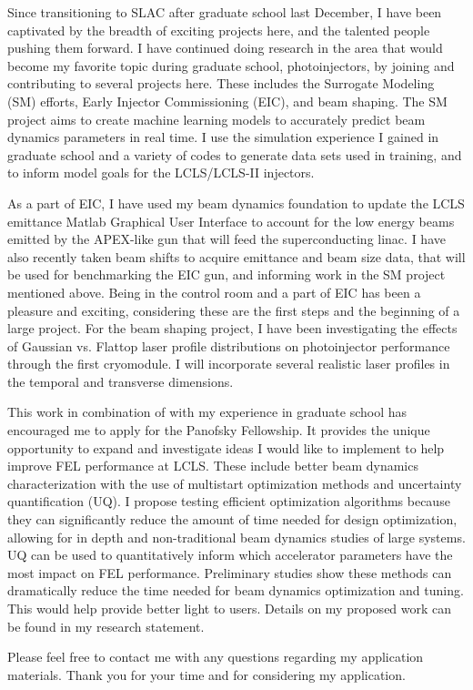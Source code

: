 Since transitioning to SLAC after graduate school last December, 
I have been captivated by the breadth of exciting projects here, 
and the talented people pushing them forward.
I have continued doing research in the area that
 would become my favorite topic during graduate school, photoinjectors, 
 by joining and contributing to several projects here. 
 These includes the Surrogate Modeling (SM) efforts, Early Injector Commissioning (EIC), and beam shaping. 
 The SM project aims to create machine learning models to accurately predict 
 beam dynamics parameters in real time. 
 I use the simulation experience I gained in graduate school and a variety of codes to generate data sets used in training, 
 and to inform model goals for the LCLS/LCLS-II injectors.
 
 As a part of EIC, I have used my beam dynamics foundation to update the 
 LCLS emittance Matlab Graphical User Interface to account for the low energy beams emitted by the 
 APEX-like gun that will feed the superconducting linac. I have also recently 
 taken beam shifts to acquire emittance and beam size data, that will be used 
 for benchmarking the EIC gun, and informing work in the SM project mentioned above. 
 Being in the control room and a part of EIC has been a pleasure and exciting, 
 considering these are the first steps and the beginning of a large project.
 For the beam shaping project, I have been investigating the effects of Gaussian vs. 
 Flattop laser profile distributions on photoinjector performance through the first cryomodule. 
 I will incorporate several realistic laser profiles in the temporal and transverse dimensions. 
 
 This work in combination of with my experience in graduate school has encouraged me 
 to apply for the Panofsky Fellowship. It provides the unique opportunity to expand and investigate ideas 
 I would like to implement to help improve FEL performance at LCLS. 
 These include better beam dynamics characterization with the use of multistart optimization methods and uncertainty quantification (UQ). 
I propose testing efficient optimization algorithms because they can significantly reduce the amount of time needed for design optimization, 
 allowing for in depth and non-traditional beam dynamics studies of large systems.
 UQ can be used to quantitatively inform  which accelerator parameters have the most impact on FEL performance. 
 Preliminary studies show these methods can dramatically reduce the time needed for beam dynamics optimization and tuning. 
 This would help provide better light to users. Details on my proposed work can be found in my research statement.
 
 Please feel free to contact me with any questions regarding my application materials. Thank you for your time and for considering my application. 
 \vspace{1em}
 